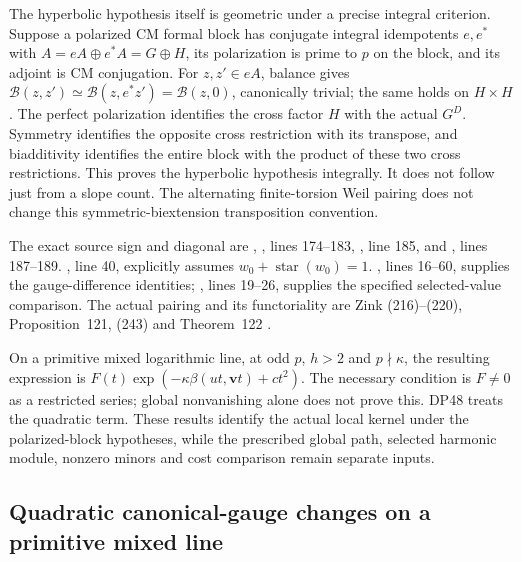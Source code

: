 \documentclass[11pt,a4paper]{article}
\theoremstyle{definition}\newtheorem{remark}[theorem]{Remark}
\begin{document}
The hyperbolic hypothesis itself is geometric under a precise integral criterion. Suppose a polarized CM formal block has conjugate integral idempotents $e,e^*$ with
$A=eA\oplus e^*A=G\oplus H$, its polarization is prime to $p$ on the block, and its adjoint is CM conjugation.
For $z,z'\in eA$, balance gives
$\mathcal B(z,z')\simeq\mathcal B(z,e^*z')=\mathcal B(z,0)$,
canonically trivial; the same holds on $H\times H$.
The perfect polarization identifies the cross factor $H$ with the actual $G^D$.
Symmetry identifies the opposite cross restriction with its transpose, and biadditivity identifies the entire block with the product of these two cross restrictions. This proves the hyperbolic hypothesis integrally. It does not follow just from a slope count. The alternating finite-torsion Weil pairing does not change this symmetric-biextension transposition convention.

The exact source sign and diagonal are
, , lines 174--183,
, line 185, and , lines 187--189.
, line 40, explicitly assumes $w_0+\operatorname{star}(w_0)=1$.
, lines 16--60, supplies the gauge-difference identities; , lines 19--26, supplies the specified selected-value comparison.
The actual pairing and its functoriality are Zink (216)--(220), Proposition~121, (243) and Theorem~122 \cite{Zink}.

On a primitive mixed logarithmic line, at odd $p$, $h>2$ and $p\nmid\kappa$, the resulting expression is
$F(t)\exp(-\kappa\beta(ut,\mathbf vt)+ct^2)$.
The necessary condition is $F\ne0$ as a restricted series; global nonvanishing alone does not prove this.
DP48 treats the quadratic term. These results identify the actual local kernel under the polarized-block hypotheses, while the prescribed global path, selected harmonic module, nonzero minors and cost comparison remain separate inputs.


\subsection{Quadratic canonical-gauge changes on a primitive mixed line}
\end{document}
